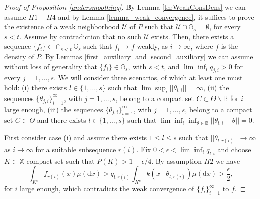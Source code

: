 \documentclass[12pt]{article}
\def \d {\mathrm{d}}
\begin{document}
\begin{proof}[Proof of Proposition \ref{undersmoothing}]%
By Lemma \ref{th:WeakConsDens} we can assume $H1-H4$ and by Lemma \ref{lemma_weak_convergence}, it suffices to prove the existence of a weak neighborhood $\mathcal{U}$ of $P$ such that $\mathcal{U} \cap \mathbb{G}_s = \emptyset$, for every $s < t$. Assume by contradiction that no such $\mathcal{U}$ exists. Then, there exists a sequence $\{f_i\} \in \cap_{s <t}\mathbb{G}_s$ such that $f_i \to f$ weakly, as $i \to \infty$, where $f$ is the density of $P$. By Lemmas \ref{first_auxiliary} and \ref{second_auxiliary} we can assume without loss of generality that $\{f_i\} \in \mathbb{G}_s$, with $s < t$, and $\lim \inf_i q_{j,i} > 0$ for every $j = 1, \dots, s$. We will consider three scenarios, of which at least one must hold: (i) there exists $l \in \{1, \dots, s\}$ such that $\lim \sup_i ||\theta_{l,i}|| = \infty$, (ii) the sequences $\{\theta_{j,i}\}_{i = 1}^\infty$, with $j = 1, \dots, s$, belong to a compact set $C \subset \Theta \backslash \mathbb{B}$ for $i$ large enough, (iii) the sequences $\{\theta_{j,i}\}_{i = 1}^\infty$, with $j = 1, \dots, s$, belong to a compact set $C \subset \Theta$ and there exists $l \in \{1, \dots, s\}$ such that $ \lim \inf _i\inf_{\theta \in \mathbb{B}} ||\theta_{l, i}-\theta || = 0$.

First consider case (i) and assume there exists $1 \leq l \leq s$ such that $|| \theta_{l,r(i)}|| \to \infty$ as $i \to \infty$ for a suitable subsequence $r(i)$. Fix $0 <\epsilon < \lim \inf_i q_{l,i}$ and choose $K \subset \mathbb{X}$ compact set such that $P(K) > 1-\epsilon/4$. By assumption $H2$ we have
\[
\int_{K^c}f_{r(i)}(x) \mu(\d x) > q_{l,r(i)}\int_{K^c}k(x \mid \theta_{l,r(i)}) \mu(\d x) > \frac{\epsilon}{2},
\]
for $i$ large enough, which contradicts the weak convergence of $\{f_i\}_{i = 1}^\infty$ to $f$.


\end{proof}
\end{document}
